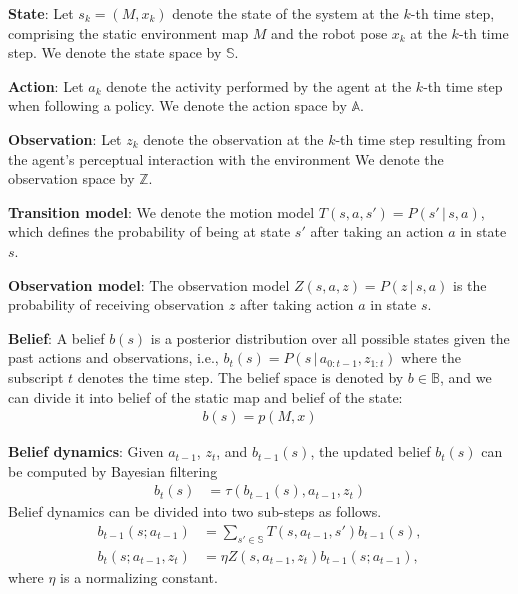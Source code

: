 \documentclass{article}
\newcommand{\ph}[1]{{\textbf{#1}:}} %
\begin{document}

\ph{State}
Let $s_k = (M, x_k)$ denote the state of the system at the $k$-th time step, comprising the static environment map $M$ and the robot pose $x_k$ at the $k$-th time step. We denote the state space by $\mathbb{S}$.

\ph{Action}
Let $a_k$ denote the activity performed by the agent at the $k$-th time step when following a policy. We denote the action space by $\mathbb{A}$.  

\ph{Observation}
Let $z_k$ denote the observation at the $k$-th time step resulting from the agent's perceptual interaction with the environment We denote the observation space by $\mathbb{Z}$. 

\ph{Transition model}
We denote the motion model $T(s, a, s') = P(s'\,|\,s, a)$, which defines the probability of being at state $s'$ after taking an action $a$ in state $s$.

\ph{Observation model}
The observation model $Z(s, a, z) = P(z\,|\,s, a)$ is the probability of receiving observation $z$ after taking action $a$ in state $s$. 

\ph{Belief}
A belief $b(s)$ is a posterior distribution over all possible states given the past actions and observations, i.e., $b_{t}(s) = P(s \,|\, a_{0:t-1}, z_{1:t})$ where the subscript $t$ denotes the time step. The belief space is denoted by $b \in \mathbb{B}$, and we can divide it into belief of the static map and belief of the state:
\begin{align}
    b(s) = p(M,x)
\end{align}

\ph{Belief dynamics}
Given $a_{t-1}$, $z_t$, and $b_{t-1}(s)$,
the updated belief $b_t(s)$ can be computed by Bayesian filtering
\begin{align}
  b_t(s) &= \tau (b_{t-1}(s), a_{t-1}, z_t)
  \label{eq:tau-belief}
\end{align}
Belief dynamics can be divided into two sub-steps as follows.
\begin{align}
  b_{t-1}(s; a_{t-1}) &= \sum_{s' \in \mathbb{S}} T(s, a_{t-1}, s') b_{t-1}(s),
  \label{eq:prediction}
  \\
  b_t(s; a_{t-1}, z_t) &= \eta Z(s, a_{t-1}, z_t) b_{t-1}(s; a_{t-1}),
  \label{eq:correction}
\end{align}
where $\eta$ is a normalizing constant.
\end{document}
